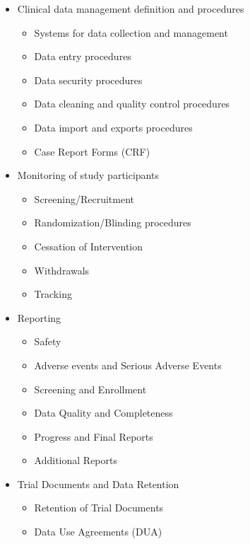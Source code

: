 \documentclass[]{book}
\providecommand{\tightlist}{%
  \setlength{\itemsep}{0pt}\setlength{\parskip}{0pt}}
\theoremstyle{definition}
\theoremstyle{definition}
\theoremstyle{definition}
\theoremstyle{remark}
\begin{document}
\begin{itemize}
\tightlist
\item
  Clinical data management definition and procedures

  \begin{itemize}
  \tightlist
  \item
    Systems for data collection and management
  \item
    Data entry procedures
  \item
    Data security procedures
  \item
    Data cleaning and quality control procedures
  \item
    Data import and exports procedures
  \item
    Case Report Forms (CRF)
  \end{itemize}
\item
  Monitoring of study participants

  \begin{itemize}
  \tightlist
  \item
    Screening/Recruitment
  \item
    Randomization/Blinding procedures
  \item
    Cessation of Intervention
  \item
    Withdrawals
  \item
    Tracking
  \end{itemize}
\item
  Reporting

  \begin{itemize}
  \tightlist
  \item
    Safety
  \item
    Adverse events and Serious Adverse Events
  \item
    Screening and Enrollment
  \item
    Data Quality and Completeness
  \item
    Progress and Final Reports
  \item
    Additional Reports
  \end{itemize}
\item
  Trial Documents and Data Retention

  \begin{itemize}
  \tightlist
  \item
    Retention of Trial Documents
  \item
    Data Use Agreements (DUA)
  \end{itemize}
\end{itemize}
\end{document}
